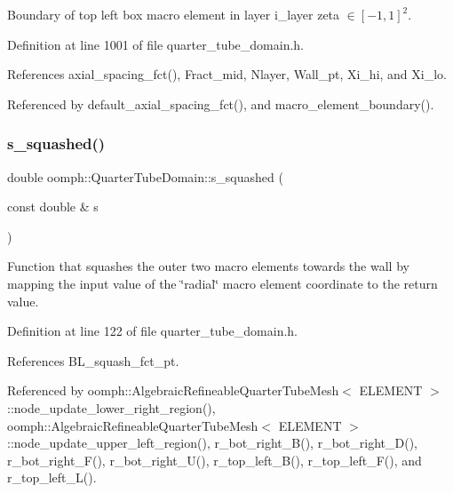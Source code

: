 Boundary of top left box macro element in layer i\+\_\+layer zeta $ \in [-1,1]^2 $. 



Definition at line 1001 of file quarter\+\_\+tube\+\_\+domain.\+h.



References axial\+\_\+spacing\+\_\+fct(), Fract\+\_\+mid, Nlayer, Wall\+\_\+pt, Xi\+\_\+hi, and Xi\+\_\+lo.



Referenced by default\+\_\+axial\+\_\+spacing\+\_\+fct(), and macro\+\_\+element\+\_\+boundary().

\mbox{\label{classoomph_1_1QuarterTubeDomain_a6ecbb8cd59208abef45384d7780853e1}} 
\subsubsection{\texorpdfstring{s\+\_\+squashed()}{s\_squashed()}}
{\footnotesize\ttfamily double oomph\+::\+Quarter\+Tube\+Domain\+::s\+\_\+squashed (\begin{DoxyParamCaption}\item[{const double \&}]{s }\end{DoxyParamCaption})\hspace{0.3cm}{\ttfamily [inline]}}



Function that squashes the outer two macro elements towards the wall by mapping the input value of the \char`\"{}radial\char`\"{} macro element coordinate to the return value. 



Definition at line 122 of file quarter\+\_\+tube\+\_\+domain.\+h.



References B\+L\+\_\+squash\+\_\+fct\+\_\+pt.



Referenced by oomph\+::\+Algebraic\+Refineable\+Quarter\+Tube\+Mesh$<$ E\+L\+E\+M\+E\+N\+T $>$\+::node\+\_\+update\+\_\+lower\+\_\+right\+\_\+region(), oomph\+::\+Algebraic\+Refineable\+Quarter\+Tube\+Mesh$<$ E\+L\+E\+M\+E\+N\+T $>$\+::node\+\_\+update\+\_\+upper\+\_\+left\+\_\+region(), r\+\_\+bot\+\_\+right\+\_\+\+B(), r\+\_\+bot\+\_\+right\+\_\+\+D(), r\+\_\+bot\+\_\+right\+\_\+\+F(), r\+\_\+bot\+\_\+right\+\_\+\+U(), r\+\_\+top\+\_\+left\+\_\+\+B(), r\+\_\+top\+\_\+left\+\_\+\+F(), and r\+\_\+top\+\_\+left\+\_\+\+L().



